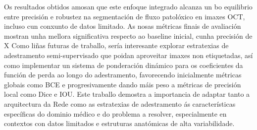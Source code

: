 \documentclass{article}
\begin{document}
Os resultados obtidos amosan que este enfoque integrado alcanza un bo equilibrio entre precisión e robustez na segmentación de fluxo patolóxico en imaxes OCT, incluso cun conxunto de datos limitado. As nosas métricas finais de avaliación mostran unha mellora significativa respecto ao baseline inicial, cunha precisión de X%
Como liñas futuras de traballo, sería interesante explorar estratexias de adestramento semi-supervisado que poidan aproveitar imaxes non etiquetadas, así como implementar un sistema de ponderación dinámico para os coeficientes da función de perda ao longo do adestramento, favorecendo inicialmente métricas globais como BCE e progresivamente dando máis peso a métricas de precisión local como Dice e IOU.
Este traballo demostra a importancia de adaptar tanto a arquitectura da Rede como as estratexias de adestramento ás características específicas do dominio médico e do problema a resolver, especialmente en contextos con datos limitados e estruturas anatómicas de alta variabilidade.

\newpage



\end{document}
